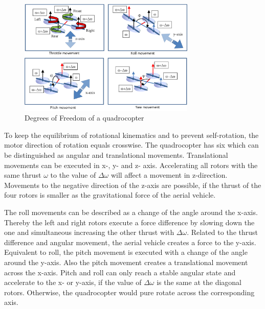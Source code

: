 \begin{figure}[!htbp]
	\centering
		\includegraphics[width=0.75\textwidth]{graphic/QuadrotoDOF.png}
	\caption{Degrees of Freedom of a quadrocopter}
	\label{fig:quadrotoDOF}
\end{figure}

\newpage
To keep the equilibrium of rotational kinematics and to prevent self-rotation,
the motor direction of rotation equals crosswise. The quadrocopter has six \DOF
which can be distinguished as angular and translational movements.
Translational movements can be executed in x-, y- and z- axis. Accelerating all rotors with
the same thrust \ensuremath{\omega} to the value of
\ensuremath{\Delta}\ensuremath{\omega}  will affect a movement in z-direction.
Movements to the negative direction of the z-axis are possible, if the thrust of
the four rotors is smaller as the gravitational force of the aerial vehicle.

 The roll movements can be described as a change of the angle around the x-axis.
Thereby the left and right rotors execute a force difference by slowing down
the one and simultaneous increasing the other thrust with
\ensuremath{\Delta}\ensuremath{\omega}. Related to the thrust difference and angular
 movement, the aerial vehicle creates a force to the y-axis. Equivalent to roll,
 the pitch movement is executed with a change of the angle around the y-axis.
 Also the pitch movement creates a translational
movement across the x-axis. Pitch and roll can only reach a stable angular state
and accelerate to the x- or y-axis, if the value of
\ensuremath{\Delta}\ensuremath{\omega} 
is the same at the diagonal rotors. Otherwise, the quadrocopter would pure rotate
across the corresponding axis.

